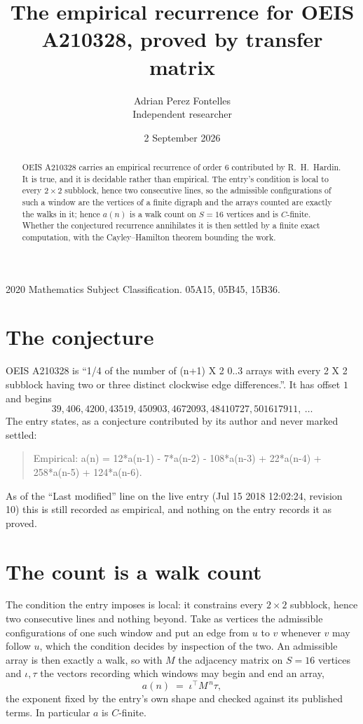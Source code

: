 \documentclass[11pt,a4paper]{article}
\title{The empirical recurrence for OEIS A210328, proved by transfer matrix}
\author{Adrian Perez Fontelles\\ \small Independent researcher}
\date{2 September 2026}
\theoremstyle{plain}
\theoremstyle{definition}
\begin{document}
\maketitle

\begin{abstract}
OEIS A210328 carries an empirical recurrence of order $6$ contributed by R.~H.~Hardin. It is
true, and it is decidable rather than empirical. The entry's condition is local to every $2\times2$ subblock, hence two consecutive lines, so
the admissible configurations of such a window are the vertices of a finite digraph and the
arrays counted are exactly the walks in it; hence $a(n)$ is a walk count on $S=16$ vertices
and is $C$-finite. Whether the conjectured recurrence annihilates it is then settled by a
finite exact computation, with the Cayley--Hamilton theorem bounding the work.
\end{abstract}

\noindent\small 2020 Mathematics Subject Classification. 05A15, 05B45, 15B36.\normalsize

\section{The conjecture}

OEIS A210328 is ``1/4 of the number of (n+1) X 2 0..3 arrays with every 2 X 2 subblock having two or three distinct clockwise edge differences.''. It has offset $1$ and begins
\[
39, 406, 4200, 43519, 450903, 4672093, 48410727, 501617911,\ \dots
\]
The entry states, as a conjecture contributed by its author and never marked settled:
\begin{quote}
Empirical: a(n) = 12*a(n-1) - 7*a(n-2) - 108*a(n-3) + 22*a(n-4) + 258*a(n-5) + 124*a(n-6).
\end{quote}
As of the ``Last modified'' line on the live entry (Jul 15 2018 12:02:24, revision 10) this is still
recorded as empirical, and nothing on the entry records it as proved.

\section{The count is a walk count}

The condition the entry imposes is local: it constrains every $2\times2$ subblock, hence two consecutive lines and nothing beyond. Take as
vertices the admissible configurations of one such window and put an edge from $u$ to $v$
whenever $v$ may follow $u$, which the condition decides by inspection of the two. An
admissible array is then exactly a walk, so with $M$ the adjacency matrix on $S=16$ vertices
and $\iota,\tau$ the vectors recording which windows may begin and end an array,
\[
a(n)\;=\;\iota^{\!\top}M^{\,n}\tau ,
\]
the exponent fixed by the entry's own shape and checked against its published terms. In
particular $a$ is $C$-finite.
\end{document}
